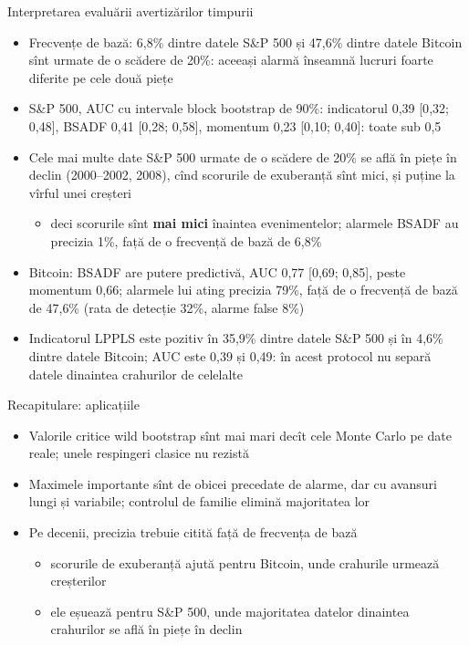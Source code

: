 \begin{frame}{Interpretarea evaluării avertizărilor timpurii}
\itemsize{\footnotesize}
\begin{itemize}
    \item Frecvențe de bază: 6{,}8\% dintre datele S\&P 500 și 47{,}6\% dintre datele Bitcoin sînt urmate de o scădere de 20\%: aceeași alarmă înseamnă lucruri foarte diferite pe cele două piețe
    \item S\&P 500, AUC cu intervale block bootstrap de 90\%: indicatorul 0{,}39 [0{,}32; 0{,}48], BSADF 0{,}41 [0{,}28; 0{,}58], momentum 0{,}23 [0{,}10; 0{,}40]: toate sub 0,5
    \item Cele mai multe date S\&P 500 urmate de o scădere de 20\% se află în piețe în declin (2000--2002, 2008), cînd scorurile de exuberanță sînt mici, și puține la vîrful unei creșteri
    \begin{itemize}
        \item deci scorurile sînt \textbf{mai mici} înaintea evenimentelor; alarmele BSADF au precizia 1\%, față de o frecvență de bază de 6{,}8\%
    \end{itemize}
    \item Bitcoin: BSADF are putere predictivă, AUC 0{,}77 [0{,}69; 0{,}85], peste momentum 0{,}66; alarmele lui ating precizia 79\%, față de o frecvență de bază de 47{,}6\% (rata de detecție 32\%, alarme false 8\%)
    \item Indicatorul LPPLS este pozitiv în 35{,}9\% dintre datele S\&P 500 și în 4{,}6\% dintre datele Bitcoin; AUC este 0{,}39 și 0{,}49: în acest protocol nu separă datele dinaintea crahurilor de celelalte
\end{itemize}
\end{frame}

\begin{frame}{Recapitulare: aplicațiile}
\itemsize{\small}
\begin{itemize}
    \item Valorile critice wild bootstrap sînt mai mari decît cele Monte Carlo pe date reale; unele respingeri clasice nu rezistă
    \item Maximele importante sînt de obicei precedate de alarme, dar cu avansuri lungi și variabile; controlul de familie elimină majoritatea lor
    \item Pe decenii, precizia trebuie citită față de frecvența de bază
    \begin{itemize}
        \item scorurile de exuberanță ajută pentru Bitcoin, unde crahurile urmează creșterilor
        \item ele eșuează pentru S\&P 500, unde majoritatea datelor dinaintea crahurilor se află în piețe în declin
    \end{itemize}
\end{itemize}
\end{frame}


